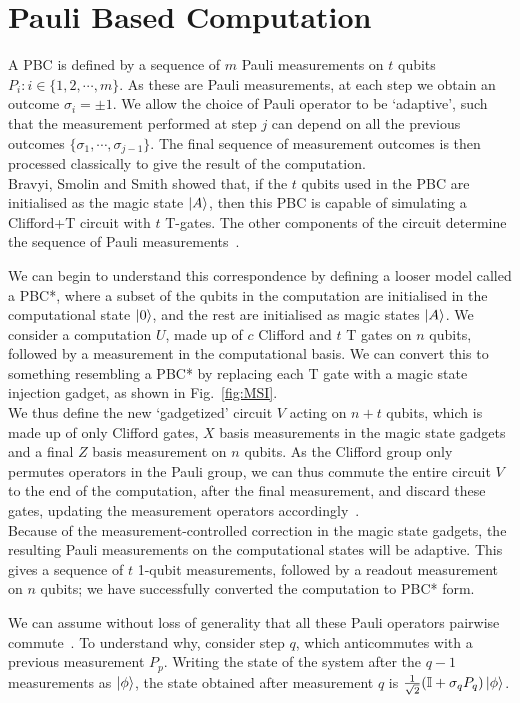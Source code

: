 \documentclass{standalone}
\begin{document}
\section{Pauli Based Computation}\label{sec:pbc}
A PBC is defined by a sequence of $m$ Pauli measurements on $t$ qubits $P_{i}:i\in\{1,2,\cdots,m\}$. As these are Pauli measurements, at each step we obtain an outcome $\sigma_{i}=\pm 1$. We allow the choice of Pauli operator to be `adaptive', such that the measurement performed at step $j$ can depend on all the previous outcomes $\{\sigma_{1},\cdots,\sigma_{j-1}\}$. The final sequence of measurement outcomes is then processed classically to give the result of the computation. \\
Bravyi, Smolin and Smith showed that, if the $t$ qubits used in the PBC are initialised as the magic state $\ket{A}$, then this PBC is capable of simulating a Clifford+T circuit with $t$ T-gates. The other components of the circuit determine the sequence of Pauli measurements~\cite{Bravyi2015}. 
\par
We can begin to understand this correspondence by defining a looser model called a PBC*, where a subset of the qubits in the computation are initialised in the computational state $\ket{0}$, and the rest are initialised as magic states $\ket{A}$. We consider a computation $U$, made up of $c$ Clifford and $t$ T gates on $n$ qubits, followed by a measurement in the computational basis. We can convert this to something resembling a PBC* by replacing each T gate with a magic state injection gadget, as shown in Fig.~\ref{fig:MSI}. \\
We thus define the new `gadgetized' circuit $V$ acting on $n+t$ qubits, which is made up of only Clifford gates, $X$ basis measurements in the magic state gadgets and a final $Z$ basis measurement on $n$ qubits. As the Clifford group only permutes operators in the Pauli group, we can thus commute the entire circuit $V$ to the end of the computation, after the final measurement, and discard these gates, updating the measurement operators accordingly~\cite{Bravyi2015}. \\
Because of the measurement-controlled correction in the magic state gadgets, the resulting Pauli measurements on the computational states will be adaptive. This gives a sequence of $t$ 1-qubit measurements, followed by a readout measurement on $n$ qubits; we have successfully converted the computation to PBC* form. 
\par
We can assume without loss of generality that all these Pauli operators pairwise commute~\cite{Bravyi2015}. To understand why, consider step $q$, which anticommutes with a previous measurement $P_{p}$. Writing the state of the system after the $q-1$ measurements as $\ket{\phi}$, the state obtained after measurement $q$ is $\frac{1}{\sqrt{2}}(\mathbb{I}+\sigma_{q}P_{q})\ket{\phi}$.\\
\end{document}
